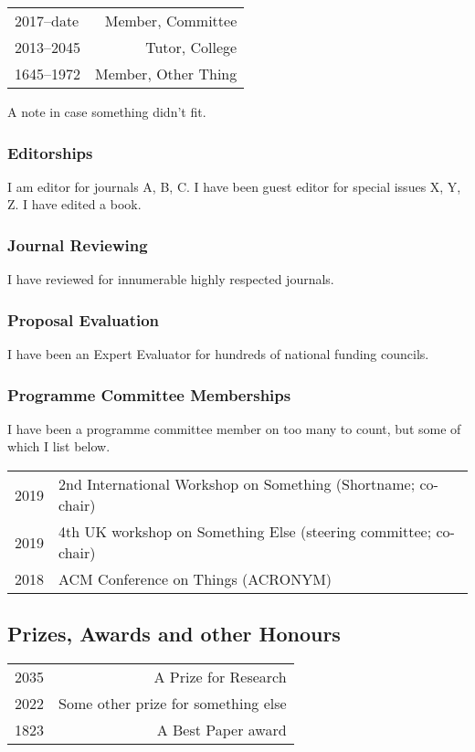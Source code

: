 \begin{tabular}{L!{\VRule}R}
  2017--date & Member, Committee\\
  2013--2045 & Tutor, College\\
  1645--1972 & Member, Other Thing\\
\end{tabular}

A note in case something didn't fit.

\subsubsection{Editorships}

I am editor for journals A, B, C. I have been guest editor for special issues X, Y, Z. I have edited a book.

\subsubsection{Journal Reviewing}

I have reviewed for innumerable highly respected journals.

\subsubsection{Proposal Evaluation}

I have been an Expert Evaluator for hundreds of national funding councils.

\subsubsection{Programme Committee Memberships}

I have been a programme committee member on too many to count, but some of which I list below.

\begin{longtabu} to 

  2019 & 2nd International Workshop on Something (Shortname; co-chair)\\
  2019 & 4th UK workshop on Something Else (steering committee; co-chair)\\

  2018 & ACM Conference on Things (ACRONYM)\\
\end{longtabu}

\subsection{Prizes, Awards and other Honours}

\begin{tabular}{L!{\VRule}R}
  2035 & A Prize for Research\\
  2022 & Some other prize for something else\\
  1823 & A Best Paper award\\
\end{tabular}


